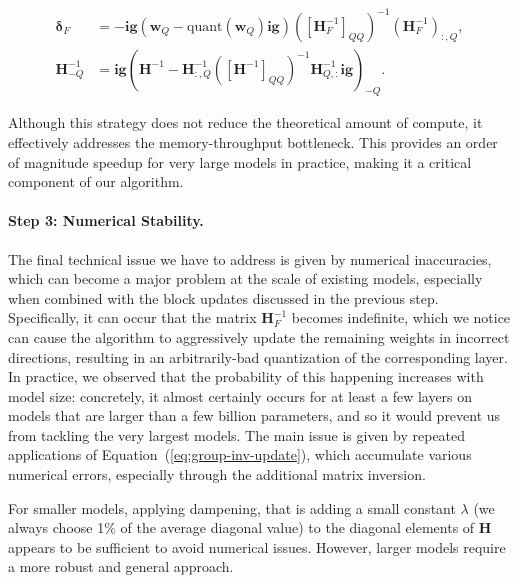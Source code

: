 \begin{align}
    \boldsymbol{\delta}_F &= -\mathbf{ig}(\mathbf{w}_Q - \text{quant}(\mathbf{w}_Q)\mathbf{ig})([\mathbf{H}_F^{-1}]_{QQ})^{-1} (\mathbf{H}_F^{-1})_{:, Q}, \\ 
    \mathbf{H}_{-Q}^{-1} &= \mathbf{ig}(\mathbf{H}^{-1} - \mathbf{H}^{-1}_{:, Q} ([\mathbf{H}^{-1}]_{QQ})^{-1} \mathbf{H}^{-1}_{Q, :} \mathbf{ig})_{-Q}. \label{eq:group-inv-update}
\end{align}

Although this strategy does not reduce the theoretical amount of compute, it effectively addresses the memory-throughput bottleneck. This provides an order of magnitude speedup for very large models in practice, making it a critical component of our algorithm.

\paragraph{Step 3: Numerical Stability.} The final technical issue we have to address is given by numerical inaccuracies, which can become a major problem at the scale of existing models, especially when combined with the block updates discussed in the previous step. Specifically, it can occur that the matrix $\mathbf{H}_F^{-1}$ becomes indefinite, which we notice can cause the algorithm to aggressively update the remaining weights in incorrect directions, resulting in an arbitrarily-bad quantization of the corresponding layer. In practice, we observed that the probability of this happening increases with model size: concretely, it almost certainly occurs for at least a few layers on models that are larger than a few billion parameters, and so it would prevent us from tackling the very largest models. The main issue is given by repeated applications of Equation~(\ref{eq:group-inv-update}), which accumulate various numerical errors, especially through the additional matrix inversion.

For smaller models, applying dampening, that is adding a small constant $\lambda$ (we always choose 1\% of the average diagonal value) to the diagonal elements of $\mathbf{H}$ appears to be sufficient to avoid numerical issues. However, larger models require a more robust and general approach.

